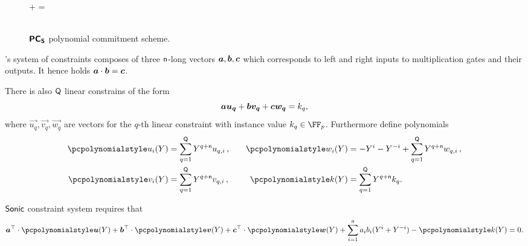 \begin{figure}[h!]
\begin{pcvstack}
\begin{pchstack}
 			\pchspace

       {
         \pcif {} \bullet \gtwo{\alpha \chi} +  \bullet \gtwo{\alpha} = \\ [\myskip] \pcind {}
         \bullet \gtwo{\chi^{- \dconst + \maxconst}} \pcthen  {}\\
         [\myskip]
           }
 		\end{pchstack}
 	\end{pcvstack}

 	\caption{$\bm{\mathsf{PC}}_{\bm{\mathsf{S}}}$ polynomial commitment scheme.}
 	\label{fig:pcoms}
 \end{figure}



\label{sec:sonic_constraint_system}
\sonic's system of constraints composes of three $\mathsf{n}$-long vectors
$\va, \vb, \vc$ which corresponds to left and right inputs to multiplication
gates and their outputs. It hence holds $\va \cdot \vb = \vc$.

There is also $\mathsf{Q}$ linear constrains of the form
\[
  \va \vec{u_q} + \vb \vec{v_q} + \vc \vec{w_q} = k_q,
\]
where $\vec{u_q}, \vec{v_q}, \vec{w_q}$ are vectors for the $q$-th linear
constraint with instance value $k_q \in \FF_p$. Furthermore define polynomials
\begin{equation}
  \begin{split}
    \p{u_i}(Y) & = \sum_{q = 1}^\linconstr Y^{q + \multconstr} u_{q, i}\,,\\
    \p{v_i}(Y) & = \sum_{q = 1}^\linconstr Y^{q + \multconstr} v_{q, i}\,,\\
  \end{split}
  \qquad
  \begin{split}
    \p{w_i}(Y) & = -Y^i - Y^{-i} + \sum_{q = 1}^\linconstr Y^{q +
      \multconstr} w_{q, i}\,,\\
    \p{k}(Y) & = \sum_{q = 1}^\linconstr Y^{q + \multconstr} k_{q}.
  \end{split}
\end{equation}

${\textnormal{\textsf{Sonic}}}$ constraint system requires that
\begin{align}
  \label{eq:sonic_constraint}
  \vec{a}^\top \cdot \vec{\p{u}} (Y) + \vec{b}^\top \cdot \vec{\p{v}} (Y) +
  \vec{c}^\top \cdot \vec{\p{w}} (Y) + \sum_{i = 1}^{\multconstr} a_i b_i (Y^i +
  Y^{-i}) - \p{k} (Y) = 0.
\end{align}

